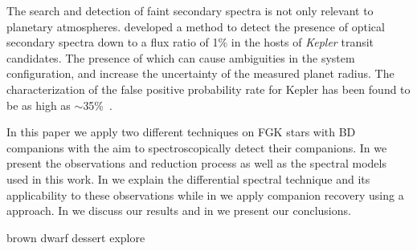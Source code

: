 {\rd{} The search and detection of faint secondary spectra is not only relevant to planetary atmospheres.
\citet{kolbl_detection_2015} developed a method to detect the presence of optical secondary spectra down to a flux ratio of 1\% in the hosts of \emph{Kepler} transit candidates.
The presence of which can cause ambiguities in the system configuration, and increase the uncertainty of the measured planet radius.
The characterization of the false positive probability rate for Kepler has been found to be as high as \(\sim\)35\%~\citet{santerne_sophie_2012}.}

In this paper we apply two different techniques on FGK stars with BD companions with the aim to spectroscopically detect their companions.
In  we present the observations and reduction process as well as the spectral models used in this work.
In  we explain the differential spectral technique and its applicability to these observations while in  we apply companion recovery using a \textchisquared{} approach.
In  we discuss our results and in  we present our conclusions.



brown dwarf dessert explore \citet{ranc_moa2007blg197_2015}


